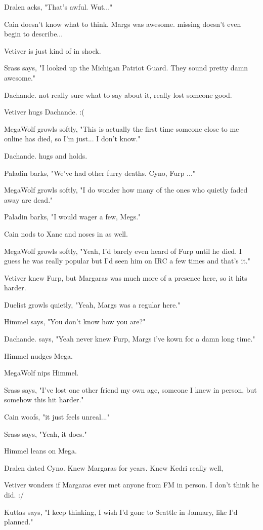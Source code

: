 Dralen acks, "That's awful. Wut..."

Cain doesn't know what to think. Margs was awesome. missing doesn't even begin to describe...

Vetiver is just kind of in shock.

Srass says, "I looked up the Michigan Patriot Guard.  They sound pretty damn awesome."

Dachande. not really sure what to say about it, really lost someone good.

Vetiver hugs Dachande. :(

MegaWolf growls softly, "This is actually the first time someone close to me online has died, so I'm just... I don't know."

Dachande. hugs and holds.

Paladin barks, "We've had other furry deaths. Cyno, Furp ..."

MegaWolf growls softly, "I do wonder how many of the ones who quietly faded away are dead."

Paladin barks, "I would wager a few, Megs."

Cain nods to Xane and noses in as well.

MegaWolf growls softly, "Yeah, I'd barely even heard of Furp until he died. I guess he was really popular but I'd seen him on IRC a few times and that's it."

Vetiver knew Furp, but Margaras was much more of a presence here, so it hits harder.

Duelist growls quietly, "Yeah, Margs was a regular here."

Himmel says, "You don't know how you are?"

Dachande. says, "Yeah never knew Furp, Margs i've kown for a damn long time."

Himmel nudges Mega.

MegaWolf nips Himmel.

Srass says, "I've lost one other friend my own age, someone I knew in person, but somehow this hit harder."

Cain woofs, "it just feels unreal..."

Srass says, "Yeah, it does."

Himmel leans on Mega.

Dralen dated Cyno. Knew Margaras for years. Knew Kedri really well,

Vetiver wonders if Margaras ever met anyone from FM in person. I don't think he did. :/

Kuttas says, "I keep thinking, I wish I'd gone to Seattle in January, like I'd planned."

